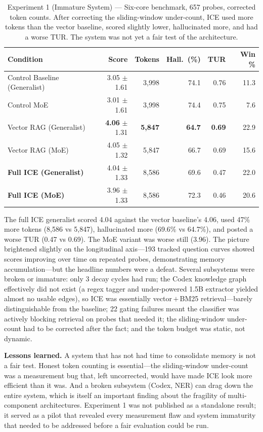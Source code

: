 \documentclass[10pt]{article}
\begin{document}
\begin{table}[htbp]
\centering
\small
\caption{Experiment 1 (Immature System) --- Six-core benchmark, 657 probes, corrected token counts. After correcting the sliding-window under-count, ICE used more tokens than the vector baseline, scored slightly lower, hallucinated more, and had a worse TUR. The system was not yet a fair test of the architecture.}
\label{tab:exp1}
\begin{tabular}{@{}lrrrrr@{}}
\toprule
\textbf{Condition} & \textbf{Score} & \textbf{Tokens} & \textbf{Hall.\ (\%)} & \textbf{TUR} & \textbf{Win \%} \\
\midrule
Control Baseline (Generalist) & 3.05 $\pm$ 1.61 & 3{,}998  & 74.1 & 0.76 & 11.3 \\
Control MoE                   & 3.01 $\pm$ 1.61 & 3{,}998  & 74.4 & 0.75 & 7.6  \\
Vector RAG (Generalist)       & \textbf{4.06} $\pm$ 1.31 & \textbf{5{,}847}  & \textbf{64.7} & \textbf{0.69} & 22.9 \\
Vector RAG (MoE)              & 4.05 $\pm$ 1.32 & 5{,}847  & 66.7 & 0.69 & 15.6 \\
\textbf{Full ICE (Generalist)}& 4.04 $\pm$ 1.33 & 8{,}586  & 69.6 & 0.47 & 22.0 \\
\textbf{Full ICE (MoE)}       & 3.96 $\pm$ 1.33 & 8{,}586  & 72.3 & 0.46 & 20.6 \\
\bottomrule
\end{tabular}
\end{table}

The full ICE generalist scored 4.04 against the vector baseline's 4.06, used 47\% more tokens (8{,}586 vs 5{,}847), hallucinated more (69.6\% vs 64.7\%), and posted a worse TUR (0.47 vs 0.69). The MoE variant was worse still (3.96). The picture brightened slightly on the longitudinal axis---193 tracked question curves showed scores improving over time on repeated probes, demonstrating memory accumulation---but the headline numbers were a defeat. Several subsystems were broken or immature: only 3 decay cycles had run; the Codex knowledge graph effectively did not exist (a regex tagger and under-powered 1.5B extractor yielded almost no usable edges), so ICE was essentially vector\,$+$\,BM25 retrieval---barely distinguishable from the baseline; 22 gating failures meant the classifier was actively blocking retrieval on probes that needed it; the sliding-window under-count had to be corrected after the fact; and the token budget was static, not dynamic.

\textbf{Lessons learned.} A system that has not had time to consolidate memory is not a fair test. Honest token counting is essential---the sliding-window under-count was a measurement bug that, left uncorrected, would have made ICE look more efficient than it was. And a broken subsystem (Codex, NER) can drag down the entire system, which is itself an important finding about the fragility of multi-component architectures. Experiment 1 was not published as a standalone result; it served as a pilot that revealed every measurement flaw and system immaturity that needed to be addressed before a fair evaluation could be run.
\end{document}
